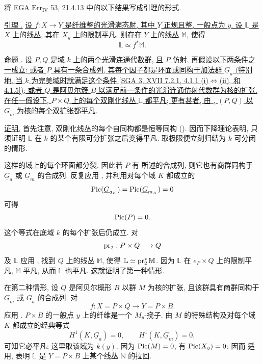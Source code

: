 将 EGA $\mathrm{Err}_{\mathrm{IV}}$ 53, 21.4.13 中的以下结果写成引理的形式.

\medskip
\noindent\underline{引理 .} \underline{设 $f:X\longrightarrow Y$ 是纤维整的光滑满态射, 其中 $Y$ 正规且整, 一般点为 $y$. 设 $\mathbb L$ 是 $X$ 上的线丛, 其在 $X_y$ 上的限制平凡. 则存在 $Y$ 上的线丛 $\mathbb M$, 使得}
\[
 \mathbb L\simeq f^*\mathbb M.
\]

\medskip
\noindent\underline{命题 .} \underline{设 $P,Q$ 是域 $k$ 上的两个光滑连通代数群, 且 $P$ 仿射. 再假设以下两条件之一成立: 或者 $P$ 具有一条合成列, 其每个因子都是环面或同构于加法群 $\underline G_a$ (特别地, 当 $k$ 为完美域时就满足这个条件 [SGA 3, XVII 7.2.1, 4.1.1 (i)$\Longleftrightarrow$(ii), 和 4.1.5]); 或者 $Q$ 是阿贝尔簇 $B$ 以满足前一条件的光滑连通仿射代数群为核的扩张. 在任一假设下, $P\times Q$ 上的每个双刚化线丛 $\mathbb L$ 都平凡; 更有甚者, 由 , $(P,Q)$ 以 $\underline G_m$ 为核的每个双扩张都平凡.}

\noindent\underline{证明.} 首先注意, 双刚化线丛的每个自同构都是恒等同构 (). 因而下降理论表明, 只须证明 $\mathbb L$ 在 $k$ 的某个有限可分扩张之后变得平凡. 取极限便立刻归结为 $k$ 可分闭的情形.

这样的域上的每个环面都分裂. 因此若 $P$ 有  所述的合成列, 则它也有商群同构于 $\underline G_a$ 或 $\underline G_m$ 的合成列. 反复应用 , 并利用对每个域 $K$ 都成立的
\[
 \Pic(\underline G_{a_K})=\Pic(\underline G_{m_K})=0
\]
可得
\[
 \operatorname{Pic}(P)=0.
\]
这个等式在底域 $k$ 的每个扩张后仍成立. 对
\[
 \operatorname{pr}_2:P\times Q\longrightarrow Q
\]
及 $\mathbb L$ 应用 , 找到 $Q$ 上的线丛 $\mathbb M$, 使得 $\mathbb L\simeq\operatorname{pr}_2^*\mathbb M$. 因为 $\mathbb L$ 在 $e_P\times Q$ 上的限制平凡, $\mathbb M$ 平凡, 从而 $\mathbb L$ 也平凡. 这就证明了第一种情形.

在第二种情形, 设 $Q$ 是阿贝尔概形 $B$ 以群 $M$ 为核的扩张, 且该群具有商群同构于 $\underline G_m$ 或 $\underline G_a$ 的合成列. 对
\[
 f:X=P\times Q\longrightarrow Y=P\times B.
\]
应用 . $P\times B$ 的一般点 $y$ 上的纤维是一个 $M_y$-挠子. 由 $M$ 的特殊结构及对每个域 $K$ 都成立的经典等式
\[
 H^1(K,\underline G_a)=0,
 \qquad
 H^1(K,\underline G_m)=0,
\]
可知它必平凡; 这里取该域为 $k(y)$. 因为 $\operatorname{Pic}(M)=0$, 有 $\operatorname{Pic}(X_y)=0$; 因而  适用, 表明 $\mathbb L$ 是 $Y=P\times B$ 上某个线丛 $\mathbb N$ 的拉回.

